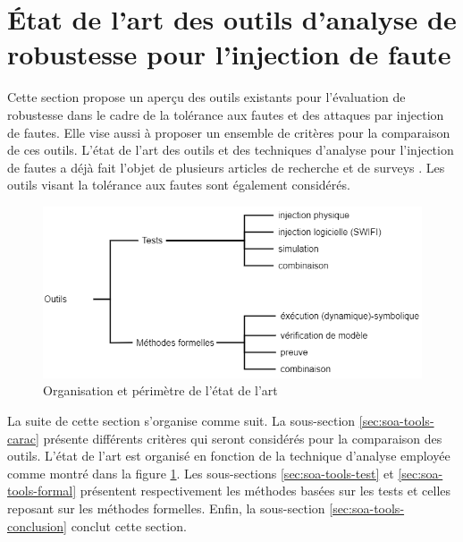     \section[État de l'art des outils d'analyse de robustesse]{État de l'art des outils d'analyse de robustesse pour l'injection de faute}
    \label{sec:soa-tools}

        Cette section propose un aperçu des outils existants pour l'évaluation de robustesse dans le cadre de la tolérance aux fautes et des attaques par injection de fautes. Elle vise aussi à proposer un ensemble de critères pour la comparaison de ces outils. L'état de l'art des outils et des techniques d'analyse pour l'injection de fautes a déjà fait l'objet de plusieurs articles de recherche \cite{kooli2014survey, Given/ICESS17, gangolli2022systematic} et de surveys \cite{Christofi/Phd13, Dureuil/Phd16, Heydemann/HDR17}. Les outils visant la tolérance aux fautes sont également considérés.        
        
        \begin{figure}[ht]\centering
          \includegraphics[scale=.45]{ch2-background/img/plan-soa-tools.drawio.png}
          \caption{Organisation et périmètre de l'état de l'art}
          \label{fig:soa-tools-scheme}
        \end{figure}
         
        La suite de cette section s'organise comme suit. La sous-section \ref{sec:soa-tools-carac} présente différents critères qui seront considérés pour la comparaison des outils. L'état de l'art est organisé en fonction de la technique d'analyse employée comme montré dans la figure \ref{fig:soa-tools-scheme}. Les sous-sections \ref{sec:soa-tools-test} et \ref{sec:soa-tools-formal} présentent respectivement les méthodes basées sur les tests et celles reposant sur les méthodes formelles.
        Enfin, la sous-section \ref{sec:soa-tools-conclusion} conclut cette section.
        
